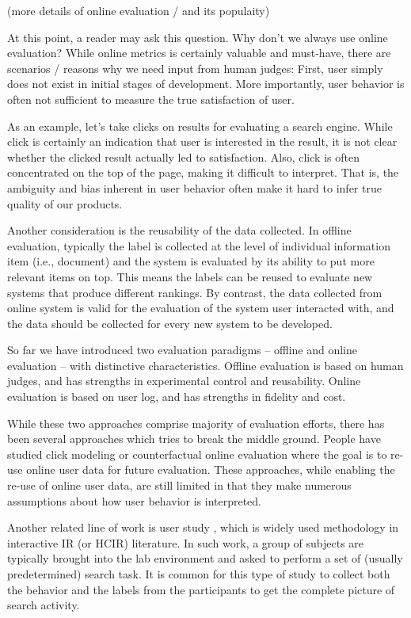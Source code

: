 \documentclass[openany]{now} %
\begin{document}
(more details of online evaluation / and its populaity)

At this point, a reader may ask this question. Why don't we always use online evaluation? While online metrics is certainly valuable and must-have, there are scenarios / reasons why we need input from human judges: First, user simply does not exist in initial stages of development. More importantly, user behavior is often not sufficient to measure the true satisfaction of user. 

As an example, let's take clicks on results for evaluating a search engine. While click is certainly an indication that user is interested in the result, it is not clear whether the clicked result actually led to satisfaction. Also, click is often concentrated on the top of the page, making it difficult to interpret. That is, the ambiguity and bias inherent in user behavior often make it hard to infer true quality of our products.

Another consideration is the reusability of the data collected. In offline evaluation, typically the label is collected at the level of individual information item (i.e., document) and the system is evaluated by its ability to put more relevant items on top. This means the labels can be reused to evaluate new systems that produce different rankings. By contrast, the data collected from online system is valid for the evaluation of the system user interacted with, and the data should be collected for every new system to be developed.

So far we have introduced two evaluation paradigms -- offline and online evaluation -- with distinctive characteristics. Offline evaluation is based on human judges, and has strengths in experimental control and reusability. Online evaluation is based on user log, and has strengths in fidelity and cost.

While these two approaches comprise majority of evaluation efforts, there has been several approaches which tries to break the middle ground. People have studied click modeling \cite{chuklin2015click} or counterfactual online evaluation \cite{Li:2015, li2010contextual} where the goal is to re-use online user data for future evaluation. These approaches, while enabling the re-use of online user data, are still limited in that they make numerous assumptions about how user behavior is interpreted.

Another related line of work is user study \cite{Bron:2013, Liu:2014, Shah:2011}, which is widely used methodology in interactive IR \cite{kelly2009methods} (or HCIR) literature. In such work, a group of subjects are typically brought into the lab environment and asked to perform a set of (usually predetermined) search task. It is common for this type of study to collect both the behavior and the labels from the participants to get the complete picture of search activity. 
\end{document}
